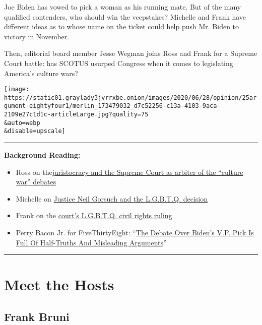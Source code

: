Joe Biden has vowed to pick a woman as his running mate. But of the many
qualified contenders, who should win the veepstakes? Michelle and Frank
have different ideas as to whose name on the ticket could help push Mr.
Biden to victory in November.

Then, editorial board member Jesse Wegman joins Ross and Frank for a
Supreme Court battle: has SCOTUS usurped Congress when it comes to
legislating America's culture wars?

\texttt{[image: https://static01.graylady3jvrrxbe.onion/images/2020/06/28/opinion/25argument-eightyfour1/merlin\_173479032\_d7c52256-c13a-4103-9aca-2109e27c1d1c-articleLarge.jpg?quality=75\\\&auto=webp\\\&disable=upscale]}

\begin{center}\rule{0.5\linewidth}{\linethickness}\end{center}

\textbf{Background Reading:}

\begin{itemize}
\item
  Ross on
  the\href{https://www.nytimes3xbfgragh.onion/2020/06/20/opinion/sunday/neil-gorsuch-supreme-court.html}{juristocracy
  and the Supreme Court as arbiter of the ``culture war'' debates}
\item
  Michelle on
  \href{https://www.nytimes3xbfgragh.onion/2020/06/15/opinion/lgbt-supreme-court-gorsuch.html}{Justice
  Neil Gorsuch and the L.G.B.T.Q. decision}
\item
  Frank on the
  \href{https://www.nytimes3xbfgragh.onion/2020/06/20/opinion/sunday/trump-supreme-court.html}{court's
  L.G.B.T.Q. civil rights ruling}
\item
  Perry Bacon Jr. for FiveThirtyEight:
  ``\href{https://fivethirtyeight.com/features/the-debate-over-bidens-vp-pick-is-full-of-half-truths-and-misleading-arguments/}{The
  Debate Over Biden's V.P. Pick Is Full Of Half-Truths And Misleading
  Arguments}''
\end{itemize}

\begin{center}\rule{0.5\linewidth}{\linethickness}\end{center}

\hypertarget{meet-the-hosts}{%
\section{Meet the Hosts}\label{meet-the-hosts}}

\hypertarget{frank-bruni}{%
\subsection{Frank Bruni}\label{frank-bruni}}

